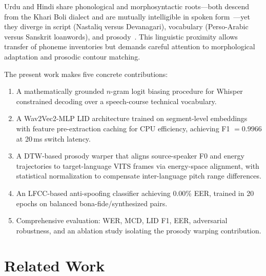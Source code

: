 \documentclass[10pt,twocolumn]{article}
\begin{document}
Urdu and Hindi share phonological and morphosyntactic roots---both descend from the Khari Boli dialect and are mutually intelligible in spoken form~\cite{chaudhary2018codeswitch}---yet they diverge in script (Nastaliq versus Devanagari), vocabulary (Perso-Arabic versus Sanskrit loanwords), and prosody~\cite{hussain2011urdu}. This linguistic proximity allows transfer of phoneme inventories but demands careful attention to morphological adaptation and prosodic contour matching.

The present work makes five concrete contributions:
\begin{enumerate}[leftmargin=*, label=\textbf{\arabic*.}]
    \item A mathematically grounded $n$-gram logit biasing procedure for Whisper constrained decoding over a speech-course technical vocabulary.
    \item A Wav2Vec2-MLP LID architecture trained on segment-level embeddings with feature pre-extraction caching for CPU efficiency, achieving F1 $= 0.9966$ at 20\,ms switch latency.
    \item A DTW-based prosody warper that aligns source-speaker F0 and energy trajectories to target-language VITS frames via energy-space alignment, with statistical normalization to compensate inter-language pitch range differences.
    \item An LFCC-based anti-spoofing classifier achieving 0.00\% EER, trained in 20 epochs on balanced bona-fide/synthesized pairs.
    \item Comprehensive evaluation: WER, MCD, LID F1, EER, adversarial robustness, and an ablation study isolating the prosody warping contribution.
\end{enumerate}

\section{Related Work}\label{sec:related}
\end{document}
